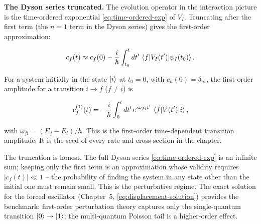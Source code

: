 \medskip\noindent\textbf{The Dyson series truncated.}
The evolution operator in the interaction picture is the time-ordered exponential \eqref{eq:time-ordered-exp} of $V_{I}$. Truncating after the first term (the $n=1$ term in the Dyson series) gives the first-order approximation:
\begin{linenomath}
\begin{equation*}
c_{f}(t) \approx c_{f}(0) - \frac{i}{\hbar}\int_{t_{0}}^{t} dt'\,\braket{f|V_{I}(t')|\psi_{I}(t_{0})}.
\end{equation*}
\end{linenomath}
For a system initially in the state $\ket{i}$ at $t_{0}=0$, with $c_{n}(0) = \delta_{ni}$, the first-order amplitude for a transition $i \to f$ ($f \neq i$) is
\begin{linenomath}
\begin{equation}
c_{f}^{(1)}(t) = -\frac{i}{\hbar}\int_{0}^{t} dt'\,e^{i\omega_{fi}t'}\,\braket{f|V(t')|i},
\label{eq:first-order-amplitude}
\end{equation}
\end{linenomath}
with $\omega_{fi} = (E_{f}-E_{i})/\hbar$. This is the first-order time-dependent transition amplitude. It is the seed of every rate and cross-section in the chapter.

\begin{note}
The truncation is honest. The full Dyson series \eqref{eq:time-ordered-exp} is an infinite sum; keeping only the first term is an approximation whose validity requires $|c_{f}(t)| \ll 1$ -- the probability of finding the system in any state other than the initial one must remain small. This is the perturbative regime. The exact solution for the forced oscillator (Chapter~5, \eqref{eq:displacement-solution}) provides the benchmark: first-order perturbation theory captures only the single-quantum transition $\ket{0}\to\ket{1}$; the multi-quantum Poisson tail is a higher-order effect.
\end{note}

